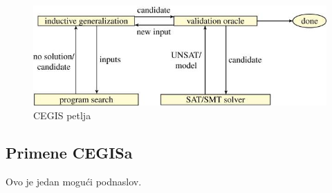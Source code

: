 \begin{figure}[h!]
\begin{center}
\includegraphics[scale=0.4]{resources/cegis.jpeg}
\end{center}
\caption{CEGIS petlja}
\label{fig:cegis}
\end{figure}


\subsection{Primene CEGISa}
\label{subsec:primeneCEGISa}

Ovo je jedan mogući podnaslov.
